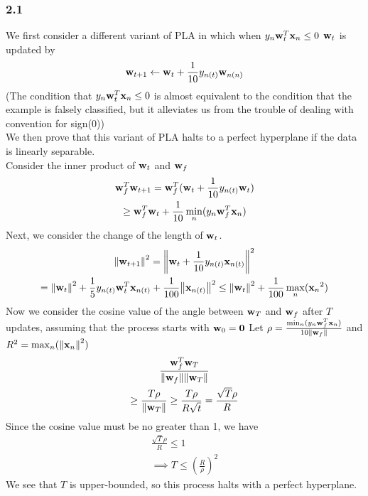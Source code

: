 \documentclass[11pt]{article}
\theoremstyle{definition}
\begin{document}
\subsubsection*{2.1}
We first consider a different variant of PLA in which when $y_n\vb{w}_t^T\vb{x}_n \leq 0$ $\vb{w}_t$ is updated by
\[
  \vb{w}_{t+1}\leftarrow\vb{w}_t + \frac{1}{10}y_{n(t)}\vb{w}_{n(n)}
\]
(The condition that $y_n\vb{w}_t^T\vb{x}_n \leq 0$ is almost equivalent to the condition that the example is falsely classified, but it alleviates us from the trouble of dealing with convention for sign($0$)) \\
We then prove that this variant of PLA halts to a perfect hyperplane if the data is linearly separable. \\
Consider the inner product of $\vb{w}_t$ and $\vb{w}_f$ 
\begin{gather*}
  \vb{w}_f^T\vb{w}_{t+1} = \vb{w}_f^T(\vb{w}_t + \frac{1}{10} y_{n(t)}\vb{w}_t) \\ 
  \geq \vb{w}_f^T\vb{w}_t + \frac{1}{10}\min_n(y_n\vb{w}_f^T\vb{x}_n)
\end{gather*}
Next, we consider the change of the length of $\vb{w}_t$. 
\begin{gather*}
  \norm{\vb{w}_{t+1}}^2 = \norm{\vb{w}_t + \frac{1}{10}y_{n(t)}\vb{x}_{n(t)}}^2 \\ 
  = \norm{\vb{w}_t}^2 + \frac{1}{5}y_{n(t)}\vb{w}_t^T\vb{x}_{n(t)} + \frac{1}{100}\norm{\vb{x}_{n(t)}}^2
  \leq \norm{\vb{w}_t}^2 + \frac{1}{100}\max_n({\vb{x}_n}^2)
\end{gather*}
Now we consider the cosine value of the angle between $\vb{w}_T$ and $\vb{w}_f$ after $T$ updates, assuming that the process starts with $\vb{w}_0 = \vb{0}$
Let $\rho = \frac{\min_n(y_n\vb{w}_f^T\vb{x}_n)}{10\norm{\vb{w}_f}}$ and $R^2 = \max_n(\norm{\vb{x}_n}^2)$
\begin{gather*}
  \frac{\vb{w}_f^T\vb{w}_T }{\norm{\vb{w}_f}\norm{\vb{w}_T}} \\ 
  \geq \frac{T\rho}{\norm{\vb{w}_T}}
  \geq \frac{T\rho}{R\sqrt{t}} = \frac{\sqrt{T}\rho}{R}
\end{gather*}
Since the cosine value must be no greater than 1, we have
\begin{gather*}
  \frac{\sqrt{T}\rho}{R} \leq 1 \\ 
  \implies T\leq(\frac{R}{\rho})^2
\end{gather*}
We see that $T$ is upper-bounded, so this process halts with a perfect hyperplane. 
\end{document}
